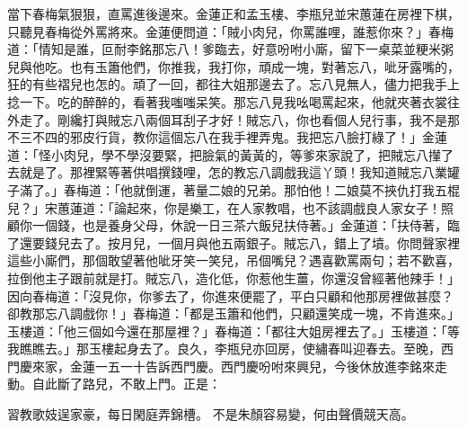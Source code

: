 當下春梅氣狠狠，直罵進後邊來。金蓮正和孟玉樓、李瓶兒並宋蕙蓮在房裡下棋，只聽見春梅從外罵將來。金蓮便問道：「賊小肉兒，你罵誰哩，誰惹你來？」春梅道：「情知是誰，叵耐李銘那忘八！爹臨去，好意吩咐小廝，留下一桌菜並粳米粥兒與他吃。也有玉簫他們，你推我，我打你，頑成一塊，對著忘八，呲牙露嘴的，狂的有些褶兒也怎的。頑了一回，都往大姐那邊去了。忘八見無人，儘力把我手上捻一下。吃的醉醉的，看著我嗤嗤呆笑。那忘八見我吆喝罵起來，他就夾著衣裳往外走了。剛纔打與賊忘八兩個耳刮子才好！賊忘八，你也看個人兒行事，我不是那不三不四的邪皮行貨，教你這個忘八在我手裡弄鬼。我把忘八臉打綠了！」金蓮道：「怪小肉兒，學不學沒要緊，把臉氣的黃黃的，等爹來家說了，把賊忘八攆了去就是了。那裡緊等著供唱撰錢哩，怎的教忘八調戲我這丫頭！我知道賊忘八業罐子滿了。」春梅道：「他就倒運，著量二娘的兄弟。那怕他！二娘莫不挾仇打我五棍兒？」宋蕙蓮道：「論起來，你是樂工，在人家教唱，也不該調戲良人家女子！照顧你一個錢，也是養身父母，休說一日三茶六飯兒扶侍著。」金蓮道：「扶侍著，臨了還要錢兒去了。按月兒，一個月與他五兩銀子。賊忘八，錯上了墳。你問聲家裡這些小廝們，那個敢望著他呲牙笑一笑兒，吊個嘴兒？遇喜歡罵兩句；若不歡喜，拉倒他主子跟前就是打。賊忘八，造化低，你惹他生薑，你還沒曾經著他辣手！」因向春梅道：「沒見你，你爹去了，你進來便罷了，平白只顧和他那房裡做甚麼？卻教那忘八調戲你！」春梅道：「都是玉簫和他們，只顧還笑成一塊，不肯進來。」玉樓道：「他三個如今還在那屋裡？」春梅道：「都往大姐房裡去了。」玉樓道：「等我瞧瞧去。」那玉樓起身去了。良久，李瓶兒亦回房，使繡春叫迎春去。至晚，西門慶來家，金蓮一五一十告訴西門慶。西門慶吩咐來興兒，今後休放進李銘來走動。自此斷了路兒，不敢上門。正是：

習教歌妓逞家豪，每日閑庭弄錦槽。
不是朱顏容易變，何由聲價競天高。

